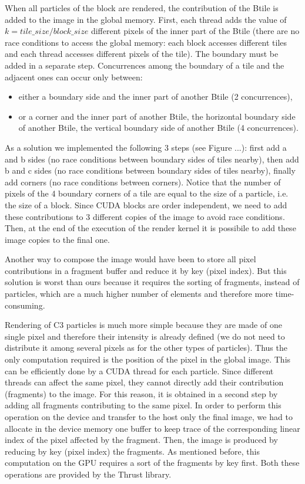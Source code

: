 \documentclass[11pt]{article}
\begin{document}
When all particles of the block are rendered, the contribution of the Btile is added to the image in the global memory. First, each thread adds the value of $k = tile\_size/block\_size$ different pixels of the inner part of the Btile (there are no race conditions to access the global memory: each block accesses different tiles and each thread accesses different pixels of the tile). The boundary must be added in a separate step. Concurrences among the boundary of a tile and the adjacent ones can occur only between:
\begin{itemize}
\item
either a boundary side and the inner part of another Btile (2 concurrences), 
\item
or a corner and the inner part of another Btile, the horizontal boundary side of another Btile, the vertical boundary side of another Btile (4 concurrences). 
\end{itemize}
As a solution we implemented the following 3 steps (see Figure ...):  
first add a and b sides (no race conditions between boundary sides of tiles nearby),
then add b and c sides (no race conditions between boundary sides of tiles nearby),
finally add corners (no race conditions between corners). Notice that the number of pixels of the 4 boundary corners of a tile are equal to the size of a particle, i.e. the size of a block. Since CUDA blocks are order independent, we need to add these contributions to 3 different copies of the image to avoid race conditions. Then, at the end of the execution of the render kernel it is possibile to add these image copies to the final one.

Another way to compose the image would have been to store all pixel contributions in a fragment buffer and reduce it by key (pixel index). But this solution is worst than ours because it requires the sorting of fragments, instead of particles, which are a much higher number of elements and therefore more time-consuming.

Rendering of C3 particles is much more simple because they are made of one single pixel and therefore their intensity is already defined (we do not need to distribute it among several pixels as for the other types of particles). Thus the only computation required is the position of the pixel in the global image. This can be efficiently done by a CUDA thread for each particle. Since different threads can affect the same pixel, they cannot directly add their contribution (fragments) to the image. For this reason, it is obtained in a second step by adding all fragments contributing to the same pixel. In order to perform this operation on the device and transfer to the host only the final image, we had to allocate in the device memory one buffer to keep trace of the corresponding linear index of the pixel affected by the fragment. Then, the image is produced by reducing by key (pixel index) the fragments. As mentioned before, this computation on the GPU requires a sort of the fragments by key first. Both these operations are provided by the Thrust library.
\end{document}
